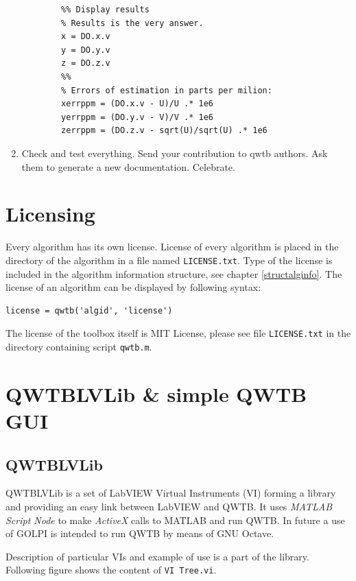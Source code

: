 \documentclass[12pt,a4paper,oneside]{report} %
\def\matlab{{\sc MATLAB}\xspace}
\def\octave{{\sc GNU Octave}\xspace}
\def\labview{{\sc LabVIEW}\xspace}
\begin{document}
\begin{enumerate}
\begin{lstlisting}
        %% Display results
        % Results is the very answer.
        x = DO.x.v
        y = DO.y.v
        z = DO.z.v
        %%
        % Errors of estimation in parts per milion:
        xerrppm = (DO.x.v - U)/U .* 1e6
        yerrppm = (DO.y.v - V)/V .* 1e6
        zerrppm = (DO.z.v - sqrt(U)/sqrt(U) .* 1e6
        \end{lstlisting} %

        \item Check and test everything. Send your contribution to qwtb authors. Ask them to
        generate a new documentation. Celebrate.

\end{enumerate}

\chapter{Licensing} %
\label{ch-license}
Every algorithm has its own license. License of every algorithm is placed in the directory of the
algorithm in a file named {\tt LICENSE.txt}. Type of the license is included in the algorithm information structure, see
chapter \ref{structalginfo}. The license of an algorithm can be displayed by following syntax:
\begin{lstlisting}
license = qwtb('algid', 'license')
\end{lstlisting}

The license of the toolbox itself is MIT License, please see file {\tt LICENSE.txt} in the directory
containing script {\tt qwtb.m}.

\chapter{QWTBLVLib \& simple QWTB GUI} %
\section{QWTBLVLib} %
QWTBLVLib is a set of \labview Virtual Instruments (VI) forming a library and providing an easy link
between \labview and QWTB. It uses {\em MATLAB Script
Node} to make {\em ActiveX} calls to \matlab and run QWTB. In future a use of {\sc GOLPI} is intended to run QWTB
by means of \octave.

Description of particular VIs and example of use is a part of the library.
Following figure shows the content of {\tt VI Tree.vi}.
\end{document}
